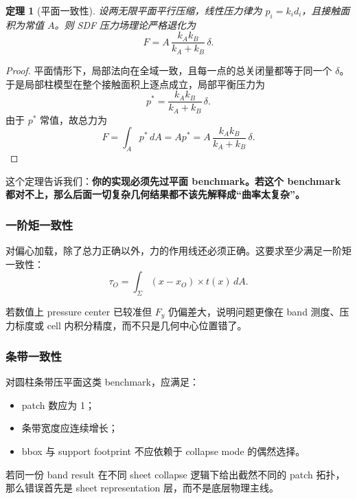 \documentclass[12pt,a4paper]{ctexart}
\newtheorem{theorem}{定理}
\begin{document}
\begin{theorem}[平面一致性]
设两无限平面平行压缩，线性压力律为 $p_i=k_i d_i$，且接触面积为常值 $A$。则 SDF 压力场理论严格退化为
\begin{equation}
    F = A\,\frac{k_Ak_B}{k_A+k_B}\,\delta.
\end{equation}
\end{theorem}

\begin{proof}
平面情形下，局部法向在全域一致，且每一点的总关闭量都等于同一个 $\delta$。于是局部柱模型在整个接触面积上逐点成立，局部平衡压力为
\begin{equation}
    p^*=\frac{k_Ak_B}{k_A+k_B}\,\delta.
\end{equation}
由于 $p^*$ 常值，故总力为
\begin{equation}
    F=\int_A p^*\,dA = A p^* = A\,\frac{k_Ak_B}{k_A+k_B}\,\delta.
\end{equation}
\end{proof}

这个定理告诉我们：\textbf{你的实现必须先过平面 benchmark。若这个 benchmark 都对不上，那么后面一切复杂几何结果都不该先解释成“曲率太复杂”。}

\subsubsection{一阶矩一致性}
对偏心加载，除了总力正确以外，力的作用线还必须正确。这要求至少满足一阶矩一致性：
\begin{equation}
    \tau_O = \int_{\Sigma}(x-x_O)\times t(x)\,dA.
\end{equation}

若数值上 pressure center 已较准但 $F_y$ 仍偏差大，说明问题更像在 band 测度、压力标度或 cell 内积分精度，而不只是几何中心位置错了。

\subsubsection{条带一致性}
对圆柱条带压平面这类 benchmark，应满足：
\begin{itemize}
    \item patch 数应为 1；
    \item 条带宽度应连续增长；
    \item bbox 与 support footprint 不应依赖于 collapse mode 的偶然选择。
\end{itemize}

若同一份 band result 在不同 sheet collapse 逻辑下给出截然不同的 patch 拓扑，那么错误首先是 sheet representation 层，而不是底层物理主线。
\end{document}
